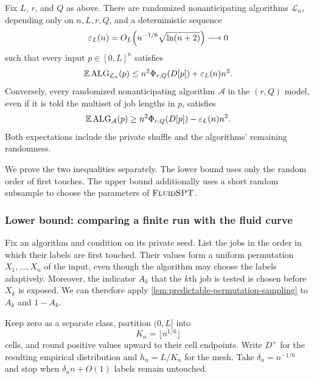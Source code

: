 \begin{theorem}
\label{thm:common-fluid-instance-transfer}
Fix $L$, $r$, and $Q$ as above.  There are randomized nonanticipating
algorithms $\mathcal L_n$, depending only on $n,L,r,Q$, and a deterministic
sequence
\begin{equation}
 \varepsilon_L(n)
 =O_L\!\left(n^{-1/6}\sqrt{\ln(n+2)}\right)
 \longrightarrow0
 \label{eq:common-transfer-rate}
\end{equation}
such that every input $p\in[0,L]^n$ satisfies
\begin{equation}
 \mathbb{E}\operatorname{ALG}_{\mathcal L_n}(p)
 \le n^2\Phi_{r,Q}(D[p])+\varepsilon_L(n)n^2.
 \label{eq:common-transfer-upper}
\end{equation}
Conversely, every randomized nonanticipating algorithm $\mathcal A$ in the
$(r,Q)$ model, even if it is told the multiset of job lengths in $p$, satisfies
\begin{equation}
 \mathbb{E}\operatorname{ALG}_{\mathcal A}(p)
 \ge n^2\Phi_{r,Q}(D[p])-\varepsilon_L(n)n^2.
 \label{eq:common-transfer-lower}
\end{equation}
Both expectations include the private shuffle and the algorithms' remaining
randomness.
\end{theorem}

We prove the two inequalities separately.  The lower bound uses only the
random order of first touches.  The upper bound additionally uses a short
random subsample to choose the parameters of $\textsc{FluidSPT}$.

\subsubsection{Lower bound: comparing a finite run with the fluid curve}
\label{sec:common-lower-transfer}

Fix an algorithm and condition on its private seed.  List the jobs in the
order in which their labels are first touched.  Their values form a uniform
permutation $X_1,\ldots,X_n$ of the input, even though the algorithm may
choose the labels adaptively.  Moreover, the indicator $A_k$ that the $k$th
job is tested is chosen before $X_k$ is exposed.  We can therefore apply
\cref{lem:predictable-permutation-sampling} to $A_k$ and $1-A_k$.

Keep zero as a separate class, partition $(0,L]$ into
\begin{equation}
 K_n=\lfloor n^{1/6}\rfloor
 \label{eq:common-transfer-grid-size}
\end{equation}
cells, and round positive values upward to their cell endpoints.  Write
$D^+$ for the resulting empirical distribution and $h_n=L/K_n$ for the
mesh.  Take $\delta_n=n^{-1/6}$ and stop when
$\delta_n n+O(1)$ labels remain untouched.

